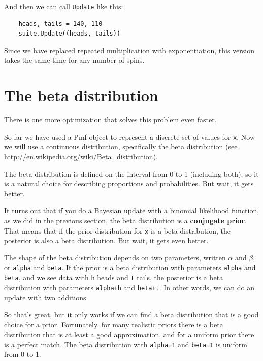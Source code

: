 \documentclass[12pt]{book}
\begin{document}
And then we can call \verb"Update" like this:

\begin{verbatim}
    heads, tails = 140, 110
    suite.Update((heads, tails))
\end{verbatim}

Since we have replaced repeated multiplication with exponentiation,
this version takes the same time for any number of spins.


\section{The beta distribution}
\label{beta}

There is one more optimization that solves this problem
even faster.

So far we have used a Pmf object to represent a discrete set of
values for {\tt x}.  Now we will use a continuous
distribution, specifically the beta distribution (see
\url{http://en.wikipedia.org/wiki/Beta_distribution}).

The beta distribution is defined on the interval from 0 to 1
(including both), so it is a natural choice for describing
proportions and probabilities.  But wait, it gets better.

It turns out that if you do a Bayesian update with a binomial
likelihood function, as we did in the previous section, the beta
distribution is a {\bf conjugate prior}.  That means that if the prior
distribution for {\tt x} is a beta distribution, the posterior is also
a beta distribution.  But wait, it gets even better.

The shape of the beta distribution depends on two parameters, written
$\alpha$ and $\beta$, or {\tt alpha} and {\tt beta}.  If the prior
is a beta distribution with parameters {\tt alpha} and {\tt beta}, and
we see data with {\tt h} heads and {\tt t} tails, the posterior is a
beta distribution with parameters {\tt alpha+h} and {\tt beta+t}.  In
other words, we can do an update with two additions.

So that's great, but it only works if we can find a beta distribution
that is a good choice for a prior.  Fortunately, for many realistic
priors there is a beta distribution that is at least a good
approximation, and for a uniform prior there is a perfect match.  The
beta distribution with {\tt alpha=1} and {\tt beta=1} is uniform from
0 to 1.
\end{document}
